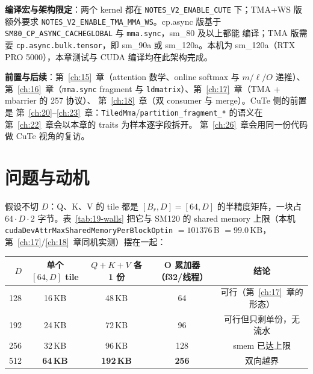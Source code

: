\textbf{编译宏与架构限定}：两个 kernel 都在
\texttt{NOTES\_V2\_}\allowbreak\texttt{ENABLE\_}\allowbreak\texttt{CUTE} 下；TMA+WS 版额外要求
\texttt{NOTES\_V2\_}\allowbreak\texttt{ENABLE\_}\allowbreak\texttt{TMA\_}\allowbreak\texttt{MMA\_WS}。cp.async 版基于
\texttt{SM80\_CP\_}\allowbreak\texttt{ASYNC\_}\allowbreak\texttt{CACHEGLOBAL} 与 \texttt{mma.sync}，sm\_80 及以上都能
编译；TMA 版需要 \texttt{cp.async.}\allowbreak\texttt{bulk.}\allowbreak\texttt{tensor}，即 sm\_90a 或 sm\_120a。本机为
sm\_120a（RTX PRO 5000），本章测试与 CUDA 编译均在此架构完成。

\textbf{前置与后续}：第~\ref{ch:15}~章（attention 数学、online softmax 与
$m/\ell/O$ 递推）、第~\ref{ch:16}~章（\texttt{mma.sync} fragment 与
\texttt{ldmatrix}）、第~\ref{ch:17}~章（TMA + mbarrier 的 257 协议）、
第~\ref{ch:18}~章（双 consumer 与 merge）。CuTe 侧的前置是
第~\ref{ch:20}--\ref{ch:23}~章：\texttt{TiledMma}/\texttt{partition\_\allowbreak{}fragment\_\allowbreak{}*}
的语义在第~\ref{ch:22}~章会以本章的 traits 为样本逐字段拆开。
第~\ref{ch:26}~章会用同一份代码做 CuTe 视角的复访。

\section{问题与动机}

假设不切 $D$：Q、K、V 的 tile 都是
$[B_r, D] = [64, D]$ 的半精度矩阵，一块占 $64 \cdot D \cdot 2$ 字节。表~\ref{tab:19-walls}
把它与 SM120 的 shared memory 上限（本机
\texttt{cuda\allowbreak{}Dev\allowbreak{}Attr\allowbreak{}Max\allowbreak{}Shared\allowbreak{}Memory\allowbreak{}Per\allowbreak{}Block\allowbreak{}Optin} $= 101376$\,B $= 99.0$\,KB，
第~\ref{ch:17}/\ref{ch:18}~章同机实测）摆在一起：

\begin{center}
\begin{tabular}{rcccc}
\toprule
$D$ & 单个 $[64,D]$ tile & $Q{+}K{+}V$ 各 1 份 & O 累加器（f32/线程） & 结论 \\
\midrule
128 & 16\,KB & 48\,KB & 64 & 可行（第~\ref{ch:17}~章的形态） \\
192 & 24\,KB & 72\,KB & 96 & 可行但只剩单份，无流水 \\
256 & 32\,KB & 96\,KB & 128 & smem 已达上限 \\
512 & \textbf{64\,KB} & \textbf{192\,KB} & \textbf{256} & 双向越界 \\
\bottomrule
\end{tabular}
\label{tab:19-walls}
\end{center}

